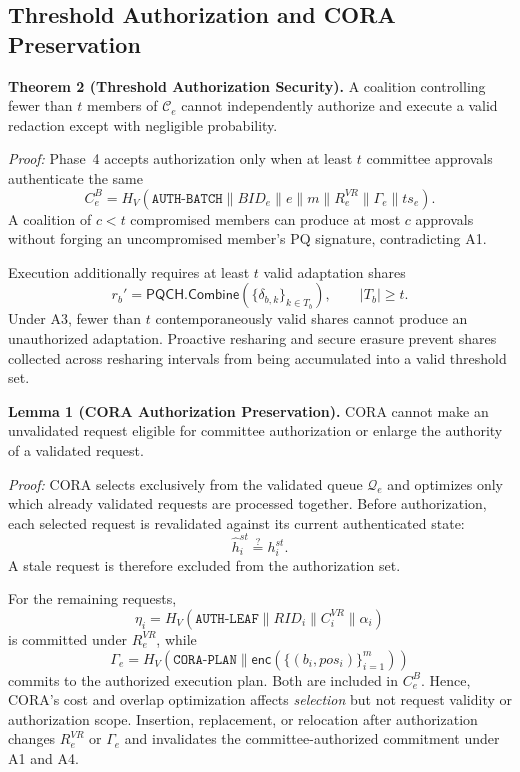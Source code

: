 \documentclass[lettersize,journal]{IEEEtran}
\begin{document}
\subsection{Threshold Authorization and CORA Preservation}

\textbf{Theorem 2 (Threshold Authorization Security).}
A coalition controlling fewer than $t$ members of
$\mathcal{C}_e$ cannot independently authorize and execute a valid
redaction except with negligible probability.

\emph{Proof:}
Phase~4 accepts authorization only when at least $t$ committee
approvals authenticate the same
\begin{equation}
C_e^B=
H_V(\texttt{AUTH-BATCH}\parallel BID_e\parallel e\parallel m
\parallel R_e^{VR}\parallel\Gamma_e\parallel ts_e).
\label{eq:sec_auth_batch}
\end{equation}
A coalition of $c<t$ compromised members can produce at most $c$
approvals without forging an uncompromised member's PQ signature,
contradicting A1.

Execution additionally requires at least $t$ valid adaptation shares
\begin{equation}
r_b'=
\mathsf{PQCH.Combine}
(\{\delta_{b,k}\}_{k\in T_b}),
\qquad |T_b|\geq t.
\end{equation}
Under A3, fewer than $t$ contemporaneously valid shares cannot produce
an unauthorized adaptation. Proactive resharing and secure erasure
prevent shares collected across resharing intervals from being
accumulated into a valid threshold set.

\medskip
\noindent\textbf{Lemma 1 (CORA Authorization Preservation).}
CORA cannot make an unvalidated request eligible for committee
authorization or enlarge the authority of a validated request.

\emph{Proof:}
CORA selects exclusively from the validated queue $\mathcal{Q}_e$ and
optimizes only which already validated requests are processed together.
Before authorization, each selected request is revalidated against its
current authenticated state:
\begin{equation}
\widehat h_i^{st}\stackrel{?}{=}h_i^{st}.
\end{equation}
A stale request is therefore excluded from the authorization set.

For the remaining requests,
\begin{equation}
\eta_i=
H_V(\texttt{AUTH-LEAF}\parallel RID_i
\parallel C_i^{VR}\parallel\alpha_i)
\end{equation}
is committed under $R_e^{VR}$, while
\begin{equation}
\Gamma_e=
H_V(\texttt{CORA-PLAN}\parallel
\mathsf{enc}(\{(b_i,pos_i)\}_{i=1}^{m}))
\end{equation}
commits to the authorized execution plan. Both are included in
$C_e^B$. Hence, CORA's cost and overlap optimization affects
\emph{selection} but not request validity or authorization scope.
Insertion, replacement, or relocation after authorization changes
$R_e^{VR}$ or $\Gamma_e$ and invalidates the committee-authorized
commitment under A1 and A4.
\end{document}
